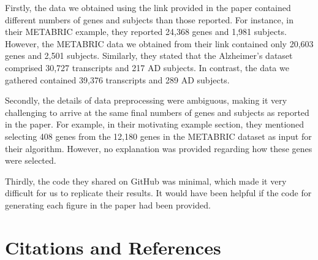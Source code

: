 \documentclass{statsoc}
\begin{document}
Firstly, the data we obtained using the link provided in the paper contained different numbers of genes and subjects than those reported. For instance, in their METABRIC example, they reported 24,368 genes and 1,981 subjects. However, the METABRIC data we obtained from their link contained only 20,603 genes and 2,501 subjects. Similarly, they stated that the Alzheimer’s dataset comprised 30,727 transcripts and 217 AD subjects. In contrast, the data we gathered contained 39,376 transcripts and 289 AD subjects.

Secondly, the details of data preprocessing were ambiguous, making it very challenging to arrive at the same final numbers of genes and subjects as reported in the paper. For example, in their motivating example section, they mentioned selecting 408 genes from the 12,180 genes in the METABRIC dataset as input for their algorithm. However, no explanation was provided regarding how these genes were selected.

Thirdly, the code they shared on GitHub was minimal, which made it very difficult for us to replicate their results. It would have been helpful if the code for generating each figure in the paper had been provided.

\section{Citations and References}


\end{document}
